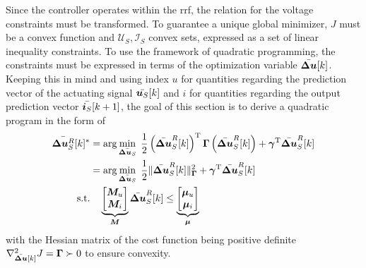 Since the controller operates within the \acrshort{rrf}, the relation for the voltage constraints must be transformed. To guarantee a unique global minimizer, $J$ must be a convex function and $\mathcal{U}_{S}, \mathcal{I}_{S}$ convex sets, expressed as a set of linear inequality constraints. To use the framework of quadratic programming, the constraints must be expressed in terms of the optimization variable $\Bar{\bm{\Delta u}}[k]$. Keeping this in mind and using index $u$ for quantities regarding the prediction vector of the actuating signal $\Bar{\bm{u}_S}[k]$ and $i$ for quantities regarding the output prediction vector $\Bar{\bm{i}_S}[k+1]$, the goal of this section is to derive a quadratic program in the form of
\begin{equation}
\begin{split}
	\Bar{\bm{\Delta u}_S^R}[k]^* & = \arg \min_{\Bar{\bm{\Delta  u}_S}}\;   \frac{1}{2} \left(\Bar{\bm{\Delta u}}_S^R[k] \right)^{\mathrm{T}} \bm{\Gamma} \left(\Bar{\bm{\Delta u}}_S^R[k] \right) + \bm{\gamma}^{\mathrm{T}} \Bar{\bm{\Delta u}}_S^R[k]\\
	& = \arg \min_{\Bar{\bm{\Delta  u}_S}}\;  \frac{1}{2} \| {\Bar{\bm{\Delta u}}_S^R[k]} \|_{\bm{\Gamma}}^2 + \bm{\gamma}^{\mathrm{T}} \Bar{\bm{\Delta u}}_S^R[k] \\
	\text{s.t.} & \quad \underbrace{
		\begin{bmatrix}
			\bm{M}_u \\
			\bm{M}_i
		\end{bmatrix}
	}_{\bm{M}}
	\Bar{\bm{\Delta u}}_S^R[k]
	\le
	\underbrace{
		\begin{bmatrix}
			\bm{\mu}_u\\
			\bm{\mu}_i
	\end{bmatrix}}_{\bm{\mu}}
	\label{equ:2_QP}
\end{split}
\end{equation}
with the Hessian matrix of the cost function being positive definite $\nabla_{\Bar{\bm{\Delta u}}[k]}^2 J = \bm{\Gamma}  \succ 0 $ to ensure convexity.

